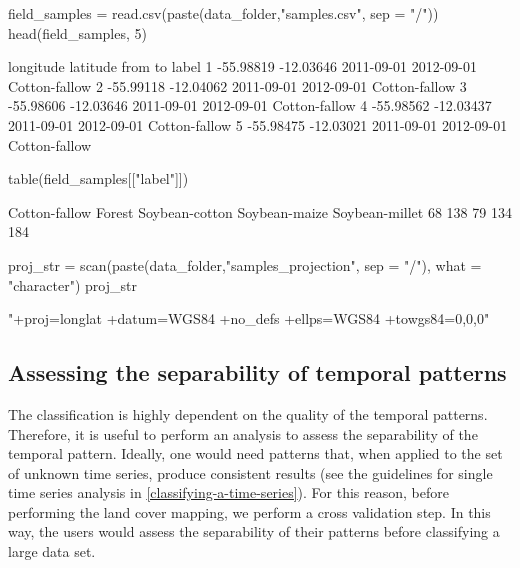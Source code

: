\documentclass[article,shortnames]{jss}
\begin{document}
\begin{CodeChunk}
\begin{CodeInput}
field_samples = read.csv(paste(data_folder,"samples.csv", sep = "/"))
head(field_samples, 5)
\end{CodeInput}
\begin{CodeOutput}
  longitude  latitude       from         to         label
1 -55.98819 -12.03646 2011-09-01 2012-09-01 Cotton-fallow
2 -55.99118 -12.04062 2011-09-01 2012-09-01 Cotton-fallow
3 -55.98606 -12.03646 2011-09-01 2012-09-01 Cotton-fallow
4 -55.98562 -12.03437 2011-09-01 2012-09-01 Cotton-fallow
5 -55.98475 -12.03021 2011-09-01 2012-09-01 Cotton-fallow
\end{CodeOutput}
\begin{CodeInput}
table(field_samples[["label"]])
\end{CodeInput}
\begin{CodeOutput}

 Cotton-fallow         Forest Soybean-cotton  Soybean-maize Soybean-millet 
            68            138             79            134            184 
\end{CodeOutput}
\begin{CodeInput}
proj_str = scan(paste(data_folder,"samples_projection", sep = "/"), 
  what = "character")
proj_str
\end{CodeInput}
\begin{CodeOutput}
[1] "+proj=longlat +datum=WGS84 +no_defs +ellps=WGS84 +towgs84=0,0,0"
\end{CodeOutput}
\end{CodeChunk}

\subsection{Assessing the separability of temporal
patterns}\label{assessing-the-separability-of-temporal-patterns}

The classification is highly dependent on the quality of the temporal
patterns. Therefore, it is useful to perform an analysis to assess the
separability of the temporal pattern. Ideally, one would need patterns
that, when applied to the set of unknown time series, produce consistent
results (see the guidelines for single time series analysis in
\autoref{classifying-a-time-series}). For this reason, before performing
the land cover mapping, we perform a cross validation step. In this way,
the users would assess the separability of their patterns before
classifying a large data set.
\end{document}
